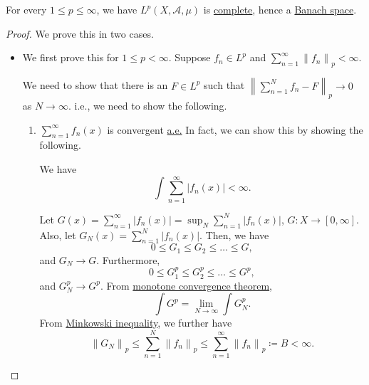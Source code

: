 \begin{theorem}\label{thm:Riesz-Fischer-theorem}
	For every \(1\leq p\leq \infty \), we have \(L^p(X, \mathcal{A} , \mu )\) is \hyperref[def:complete]{complete}, hence a
	\hyperref[def:Banach-space]{Banach space}.
\end{theorem}
\begin{proof}
	We prove this in two cases.
	\begin{itemize}
		\item We first prove this for \(1\leq p<\infty \). Suppose \(f_{n} \in L^p\) and \(\sum\limits_{n=1}^{\infty} \left\lVert f_{n} \right\rVert_{p}<\infty \).

		      We need to show that there is an \(F\in L^p\) such that \(\left\lVert \sum\limits_{n=1}^{N} f_{n} -F\right\rVert_{p}\to 0\) as \(N\to \infty \). i.e., we need to show
		      the following.
		      \begin{enumerate}
			      \item \(\sum\limits_{n=1}^{\infty} f_{n}(x)\) is convergent \hyperref[def:mu-almost-everywhere]{a.e.} In fact, we can show this by showing the following.
			            \begin{claim}
				            We have
				            \[
					            \int \sum\limits_{n=1}^{\infty} \left\vert f_{n} (x) \right\vert < \infty .
				            \]
			            \end{claim}
			            \begin{explanation}
				            Let \(G(x) = \sum\limits_{n=1}^{\infty} \left\vert f_{n} (x) \right\vert = \sup _N \sum\limits_{n=1}^{N} \left\vert f_{n} (x) \right\vert  \), \(G\colon X\to [0, \infty ]\). Also, let
				            \(G_{N} (x)= \sum\limits_{n=1}^{N} \left\vert f_{n} (x) \right\vert \). Then, we have
				            \[
					            0\leq G_{1} \leq G_2 \leq \dots \leq G,
				            \]
				            and \(G_{N} \to G \). Furthermore,
				            \[
					            0\leq G^p_1 \leq G^p_2 \leq \dots \leq G^p,
				            \]
				            and \(G^p_N \to G^p\). From \hyperref[thm:MCT]{monotone convergence theorem},
				            \[
					            \int G^p = \lim\limits_{N \to \infty} \int G^p_N.
				            \]
				            From \hyperref[thm:Minkowski-inequality]{Minkowski inequality}, we further have
				            \[
					            \left\lVert G_N\right\rVert _p \leq \sum\limits_{n=1}^{N} \left\lVert f_{n} \right\rVert _p \leq \sum\limits_{n=1}^{\infty} \left\lVert f_{n} \right\rVert _p \coloneqq B < \infty.
\]
\end{explanation}
\end{enumerate}
\end{itemize}
\end{proof}
